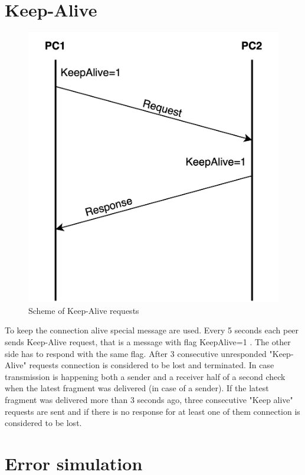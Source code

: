 \documentclass{article}
\begin{document}
\section{Keep-Alive}

\begin{figure}[h]
    \centering
    \includegraphics[width=\textwidth]{images/keepalive.png}
    \caption{Scheme of Keep-Alive requests}
    \label{fig:mesh1}
\end{figure}
To keep the connection alive special message are used. Every 5 seconds each peer sends Keep-Alive request, that is a message with flag KeepAlive=1 . The other side has to respond with the same flag. After 3 consecutive unresponded "Keep-Alive" requests connection is considered to be lost and terminated. In case transmission is happening both a sender and a receiver half of a second check when the latest fragment was delivered (in case of a sender). If the latest fragment was delivered more than 3 seconds ago, three consecutive "Keep alive" requests are sent and if there is no response for at least one of them connection is considered to be lost.

\newpage

\section{Error simulation}
\end{document}
